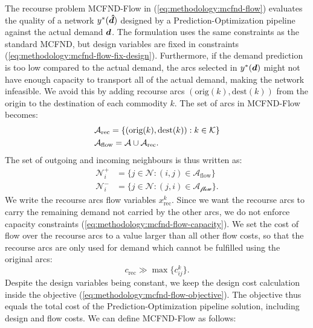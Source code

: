 The recourse problem MCFND-Flow in (\ref{eq:methodology:mcfnd-flow}) evaluates the quality of a network $y^*({\bm{\hat{d}}})$ designed by a Prediction-Optimization pipeline against the actual demand ${\bm{d}}$. The formulation uses the same constraints as the standard MCFND, but design variables are fixed in constraints (\ref{eq:methodology:mcfnd-flow-fix-design}). Furthermore, if the demand prediction is too low compared to the actual demand, the arcs selected in $y^*({\bm{d}})$ might not have enough capacity to transport all of the actual demand, making the network infeasible. We avoid this by adding recourse arcs $(\text{orig}(k), \text{dest}(k))$ from the origin to the destination of each commodity $k$. The set of arcs in MCFND-Flow becomes: \begin{equation}
    \begin{aligned}
    &\mathcal{A}_\text{rec} = \{(\text{orig}(k), \text{dest}(k)) : {k \in \mathcal{K}}\}\\
    &\mathcal{A}_\text{flow} = \mathcal{A} \cup \mathcal{A}_\text{rec}.
\end{aligned} 
\end{equation}
The set of outgoing and incoming neighbours is thus written as: \begin{equation}
    \begin{aligned}
    \mathcal{N}^+_i &= \{j \in \mathcal{N} : (i, j) \in \mathcal{A}_\text{flow} \}\\
    \mathcal{N}^-_i &= \{j \in \mathcal{N} : (j, i) \in \mathcal{A_\text{flow}} \}.
\end{aligned}
\end{equation}
We write the recourse arcs flow variables $x_\text{rec}^k$. Since we want the recourse arcs to carry the remaining demand not carried by the other arcs, we do not enforce capacity constraints (\ref{eq:methodology:mcfnd-flow-capacity}).
We set the cost of flow over the recourse arcs to a value larger than all other flow costs, so that the recourse arcs are only used for demand which cannot be fulfilled using the original arcs: 
\begin{equation}
    c_\text{rec} \gg \max \{c_{ij}^k \}.
\end{equation}
Despite the design variables being constant, we keep the design cost calculation inside the objective (\ref{eq:methodology:mcfnd-flow-objective}). The objective thus equals the total cost of the Prediction-Optimization pipeline solution, including design and flow costs. We can define MCFND-Flow as follows:

